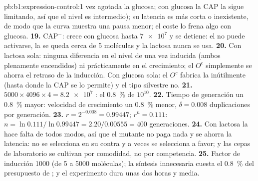 \begin{solution}{pb:b1:expression-control:1}
vez agotada la glucosa; con glucosa la CAP la sigue limitando, así que el
nivel es intermedio); su latencia es más corta o inexistente, de modo que la
curva muestra una pausa menor; el coste lo frena algo con glucosa.
\textbf{19.} CAP$^-$: crece con glucosa hasta $\num{7e7}$ y se detiene: el
 no puede activarse, la  se queda cerca de 5 moléculas y la
lactosa nunca se usa.
\textbf{20.} Con lactosa sola: ninguna diferencia en el nivel de  una
vez inducida (ambos plenamente encendidos) ni prácticamente en el
crecimiento; el $O^c$ simplemente se ahorra el retraso de la inducción. Con
glucosa sola: el $O^c$ fabrica la  inútilmente (hasta donde la CAP se
lo permite) y el tipo silvestre no.
\textbf{21.} $5000\times 4096\times 4 = \num{8.2e7}$ : el \qty{0.8}{\%}
de $10^{10}$.
\textbf{22.} Tiempo de generación un \qty{0.8}{\%} mayor: velocidad de
crecimiento un \qty{0.8}{\%} menor, $\delta = 0.008$ duplicaciones por
generación.
\textbf{23.} $r = 2^{-0.008} = 0.99447$; $r^n = 0.111$: $n =
\ln 0.111/\ln 0.99447 = 2.20/0.00555 = 400$ generaciones.
\textbf{24.} Con lactosa la  hace falta de todos modos, así que el
mutante no paga nada y se ahorra la latencia: no se selecciona en su contra
y a veces se selecciona a favor; y las cepas de laboratorio se cultivan por
comodidad, no por competencia.
\textbf{25.} Factor de inducción 1000 (de 5 a \num{5000} moléculas); la
síntesis innecesaria cuesta el \qty{0.8}{\%} del presupuesto de ; y el
experimento dura unas dos horas y media.
\end{solution}
